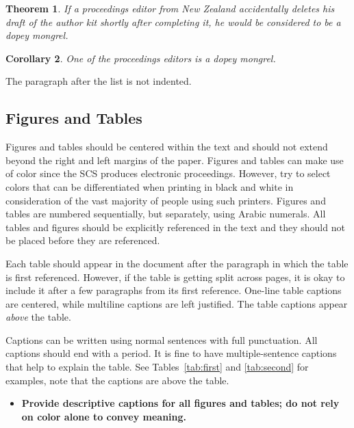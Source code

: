 \documentclass{scspaperproc}
\theoremstyle{scsthe}
\newtheorem{theorem}{Theorem}
\newtheorem{corollary}[theorem]{Corollary}
\begin{document}
    \begin{theorem}
        If a proceedings editor from New Zealand accidentally deletes his draft of the author kit shortly after completing it, he would be considered to be a dopey mongrel.
    \end{theorem}

    \begin{corollary}
        One of the proceedings editors is a dopey mongrel.
    \end{corollary}

    The paragraph after the list is not indented.


    \subsection{Figures and Tables}
    \label{sec:graphics}
    Figures and tables should be centered within the text and should not extend beyond the right and left margins of the paper. Figures and tables can make use of color since the SCS produces electronic proceedings. However, try to select colors that can be differentiated when printing in black and white in consideration of the vast majority of people using such printers. Figures and tables are numbered sequentially, but separately, using Arabic numerals. All tables and figures should be explicitly referenced in the text and they should not be placed before they are referenced.

    Each table should appear in the document after the paragraph in which the table is first referenced. However, if the table is getting split across pages, it is okay to include it after a few paragraphs from its first reference. One-line table captions are centered, while multiline captions are left justified. The table captions appear \emph{above} the table.

    Captions can be written using normal sentences with full punctuation. All captions should end with a period. It is fine to have multiple-sentence captions that help to explain the table. See Tables~\ref{tab:first} and \ref{tab:second} for examples, note that the captions are above the table.
    \begin{itemize}
        \item \textbf{Provide descriptive captions for all figures and tables; do not rely on color alone to convey meaning.}
    \end{itemize}
\end{document}
